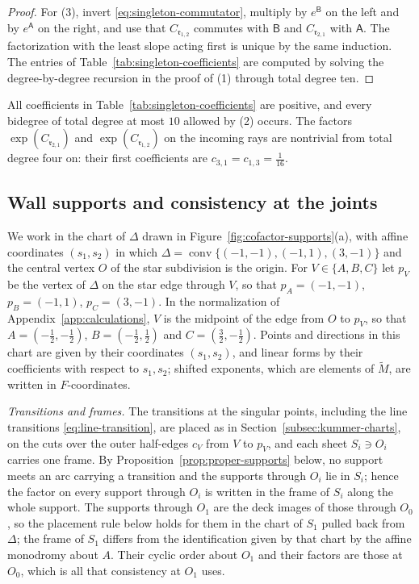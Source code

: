 \begin{proof}
For (3), invert \eqref{eq:singleton-commutator}, multiply by
$e^{\mathsf B}$ on the left and by $e^{\mathsf A}$ on the right, and use that
$C_{\mathfrak r_{1,2}}$ commutes with $\mathsf B$ and $C_{\mathfrak r_{2,1}}$
with $\mathsf A$.  The factorization with the least slope acting first is
unique by the same induction.  The entries of
Table~\ref{tab:singleton-coefficients} are computed by solving the
degree-by-degree recursion in the proof of (1) through total degree ten.
\end{proof}

All coefficients in Table~\ref{tab:singleton-coefficients} are positive, and
every bidegree of total degree at most $10$ allowed by (2) occurs.  The
factors $\exp(C_{\mathfrak r_{2,1}})$ and $\exp(C_{\mathfrak r_{1,2}})$ on
the incoming rays are nontrivial from total degree four on: their first
coefficients are $c_{3,1}=c_{1,3}=\frac1{16}$.

\subsection{Wall supports and consistency at the joints}
\label{subsec:cofactor-supports}

We work in the chart of $\Delta$ drawn in
Figure~\ref{fig:cofactor-supports}(a), with affine coordinates $(s_1,s_2)$
in which
$\Delta=\operatorname{conv}\{(-1,-1),(-1,1),(3,-1)\}$ and the central vertex
$O$ of the star subdivision is the origin.  For $V\in\{A,B,C\}$ let $p_V$ be
the vertex of $\Delta$ on the star edge through $V$, so that
$p_A=(-1,-1)$, $p_B=(-1,1)$, $p_C=(3,-1)$.  In the normalization of
Appendix~\ref{app:calculations}, $V$ is the midpoint of the edge from $O$ to
$p_V$, so that $A=(-\frac12,-\frac12)$, $B=(-\frac12,\frac12)$ and
$C=(\frac32,-\frac12)$.  Points and directions in this chart are given by
their coordinates $(s_1,s_2)$, and linear forms by their coefficients with
respect to $s_1,s_2$; shifted exponents, which are elements of
$\widetilde M$, are written in $F$-coordinates.

\emph{Transitions and frames.}  The transitions at the singular points,
including the line transitions \eqref{eq:line-transition}, are placed as in
Section~\ref{subsec:kummer-charts}, on the cuts over the outer half-edges
$c_V$ from $V$ to $p_V$, and each sheet $S_i\ni O_i$ carries one frame.  By
Proposition~\ref{prop:proper-supports} below, no support meets an arc
carrying a transition and the supports through $O_i$ lie in $S_i$; hence the
factor on every support through $O_i$ is written in the frame of $S_i$ along
the whole support.  The supports through $O_1$ are the deck images of those
through $O_0$, so the placement rule below holds for them in the chart of
$S_1$ pulled back from $\Delta$; the frame of $S_1$ differs from the
identification given by that chart by the affine monodromy about $A$.  Their cyclic order about $O_1$ and their
factors are those at $O_0$, which is all that consistency at $O_1$ uses.

